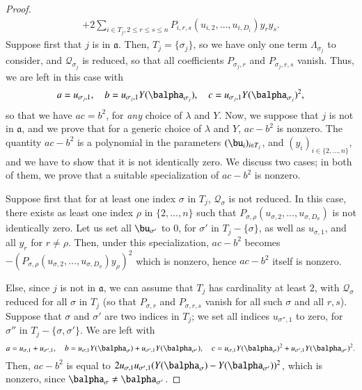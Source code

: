 \documentclass[final,1p,times,authoryear]{elsarticle}
\newcommand{\mf}{Y}
\newcommand{\residueI}{\mathscr{Q}}
\begin{document}
\begin{proof}
\begin{align*}
        +2 \sum_{i \in T_j, 2 \le r \le s \le n} P_{i,r,s}(u_{i,2},\dots,u_{i,D_i})y_ry_s.
  \end{align*}
  Suppose first that $j$ is in $\mathfrak{a}$. Then, $T_j=\{\sigma_j\}$, so we 
  have only one term $\Lambda_{\sigma_j}$ to consider, and $\residueI_{\sigma_j}$ 
  is reduced, so that all coefficients $P_{\sigma_j,r}$ and
  $P_{\sigma_j,r,s}$ vanish. Thus, we are left in
  this case with
  $$
  a = u_{\sigma_j,1}, \quad
  b = u_{\sigma_j,1} \mf(\balpha_{\sigma_j}), \quad
  c = u_{\sigma_j,1} \mf(\balpha_{\sigma_j})^2,
  $$ so that we have $ac=b^2$, for {\em any} choice of $\lambda$ and
  $\mf$. Now, we suppose that $j$ is not in $\mathfrak{a}$, and we prove
  that for a generic choice of $\lambda$ and $\mf$, $ac-b^2$ is nonzero.
  The quantity $ac-b^2$ is a polynomial in the parameters
  $(\bu_i)_{i\in T_j}$, and $(y_i)_{i \in \{2,\dots,n\}}$, and we have
  to show that it is not identically zero. We discuss two cases; in both
  of them, we prove that a suitable specialization of $ac-b^2$ is
  nonzero.

  Suppose first that for at least one index $\sigma$ in $T_j$,
  $\residueI_\sigma$ is not reduced. In this case, there exists as least one
  index $\rho$ in $\{2,\dots,n\}$ such that
  $P_{\sigma,\rho}(u_{\sigma,2},\dots,u_{\sigma,D_\sigma})$ is not
  identically zero. Let us set all $\bu_{\sigma'}$
  to $0$, for $\sigma'$ in $T_j-\{\sigma\}$, as well as $u_{\sigma,1}$,
  and all $y_r$ for $r\ne \rho$. Then, under this specialization,
  $ac-b^2$ becomes
  $-(P_{\sigma,\rho}(u_{\sigma,2},\dots,u_{\sigma,D_\sigma})y_\rho)^2$
  which is nonzero, hence $ac-b^2$ itself is nonzero.

  Else, since $j$ is not in $\mathfrak{a}$, we can assume that $T_j$
  has cardinality at least $2$, with $\residueI_\sigma$ reduced for all $\sigma$
  in $T_j$ (so that $P_{\sigma,r}$ and $P_{\sigma,r,s}$ vanish for 
  all such $\sigma$ and all $r,s$). Suppose that $\sigma$ and $\sigma'$ are two indices in
  $T_j$; we set all indices $u_{\sigma'',1}$ to zero, for $\sigma''$
  in $T_j-\{\sigma,\sigma'\}$. We are left with
  $$
  a=u_{\sigma,1}+u_{\sigma',1},\quad
  b=u_{\sigma,1}\mf(\balpha_{\sigma})+u_{\sigma',1}\mf(\balpha_{\sigma'}),\quad
  c=u_{\sigma,1}\mf(\balpha_{\sigma})^2+u_{\sigma',1}\mf(\balpha_{\sigma'})^2.
  $$
  Then, $ac-b^2$ is equal to $2u_{\sigma,1}u_{\sigma',1}(\mf(\balpha_{\sigma})-\mf(\balpha_{\sigma'}))^2$,
  which is nonzero, since $\balpha_\sigma \ne \balpha_{\sigma'}$.
\end{proof}
\end{document}
